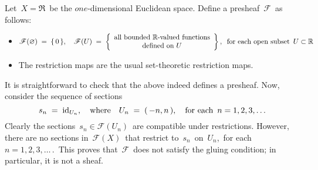 
\begin{example}
\mbox{}\vskip 0.1cm
\noindent
Let \,$X = \Re$\, be the $one$-dimensional Euclidean space.
Define a presheaf \,$\mathscr{F}$\, as follows:
\begin{itemize}
\item
	$
	\mathscr{F}(\varnothing) \;=\; \{\,0\,\},
	\quad
	\mathscr{F}(U) \;=\; \left\{\begin{array}{c}
		\textnormal{all bounded $\mathbb{R}$-valued functions}
		\\
		\textnormal{defined on $U$}
		\end{array}\right\},
		\;\;\textnormal{for each open subset \,$U \subset \mathbb{R}$}
	$
\item
	The restriction maps are the usual set-theoretic restriction maps.
\end{itemize}
It is straightforward to check that the above indeed defines a presheaf.
Now, consider the sequence of sections
\begin{equation*}
s_{n} \;=\; \textnormal{id}_{U_{n}},
\quad\textnormal{where}\quad 
U_{n} \;=\; (\,-n,n\,),
\quad\textnormal{for each \,$n = 1, 2, 3, \ldots$}
\end{equation*}
Clearly the sections \,$s_{n} \in \mathscr{F}(U_{n})$\, are compatible under restrictions.
However, there are no sections in \,$\mathscr{F}(X)$\, that restrict to \,$s_{n}$\, on \,$U_{n}$,\, for each \,$n = 1, 2, 3, \ldots\,$.\,
This proves that \,$\mathscr{F}$\, does not satisfy the gluing condition; in particular, it is not a sheaf.
\end{example}

